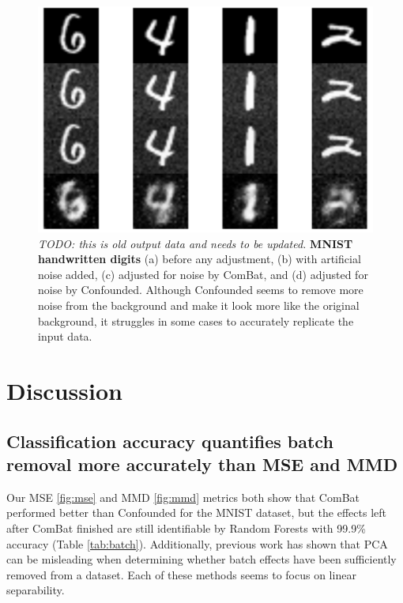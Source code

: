 \documentclass[notitlepage]{article}
\begin{document}
\begin{figure}
	\centering
	\includegraphics[width=\columnwidth]{figures/rough/mnist.png}
	\caption{\textit{TODO: this is old output data and needs to be updated.} \textbf{MNIST handwritten digits} (a) before any adjustment,
	(b) with artificial noise added,
	(c) adjusted for noise by ComBat, and
	(d) adjusted for noise by Confounded.
	Although Confounded seems to remove more noise from the background and make it look more like the original background, it struggles in some cases to accurately replicate the input data.}
	\label{fig:mnist}
\end{figure}

\section{Discussion} \label{sec:discussion}

\subsection{Classification accuracy quantifies batch removal more accurately than MSE and MMD}

Our MSE \ref{fig:mse} and MMD \ref{fig:mmd} metrics both show that ComBat performed better than Confounded for the MNIST dataset, but the effects left after ComBat finished are still identifiable by Random Forests with 99.9\% accuracy (Table \ref{tab:batch}).
Additionally, previous work \cite{dayton_classifying_2017-1} has shown that PCA can be misleading when determining whether batch effects have been sufficiently removed from a dataset.
Each of these methods seems to focus on linear separability.
\end{document}
